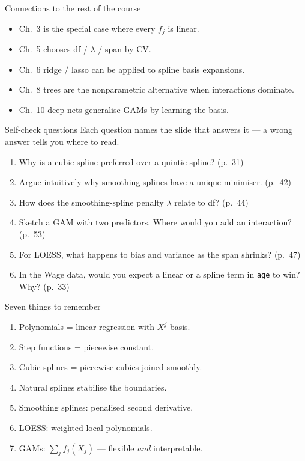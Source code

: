 \documentclass[aspectratio=169,11pt]{beamer}
\begin{document}
\begin{frame}{Connections to the rest of the course}
  \begin{itemize}
    \item Ch.~3 is the special case where every $f_j$ is linear.
    \item Ch.~5 chooses df / $\lambda$ / span by CV.
    \item Ch.~6 ridge / lasso can be applied to spline basis
          expansions.
    \item Ch.~8 trees are the nonparametric alternative when
          interactions dominate.
    \item Ch.~10 deep nets generalise GAMs by learning the basis.
  \end{itemize}
\end{frame}

\begin{frame}{Self-check questions}
  Each question names the slide that answers it --- a wrong answer tells you
  where to read.
  \begin{enumerate}
    \item Why is a cubic spline preferred over a quintic spline?
          (p.~31)
    \item Argue intuitively why smoothing splines have a unique
          minimiser. (p.~42)
    \item How does the smoothing-spline penalty $\lambda$ relate to df?
          (p.~44)
    \item Sketch a GAM with two predictors. Where would you add an
          interaction? (p.~53)
    \item For LOESS, what happens to bias and variance as the span
          shrinks? (p.~47)
    \item In the Wage data, would you expect a linear or a spline term
          in \texttt{age} to win? Why? (p.~33)
  \end{enumerate}
\end{frame}

\begin{frame}{Seven things to remember}
  \begin{enumerate}
    \item Polynomials = linear regression with $X^j$ basis.
    \item Step functions = piecewise constant.
    \item Cubic splines = piecewise cubics joined smoothly.
    \item Natural splines stabilise the boundaries.
    \item Smoothing splines: penalised second derivative.
    \item LOESS: weighted local polynomials.
    \item GAMs: $\sum_j f_j(X_j)$ --- flexible \emph{and} interpretable.
  \end{enumerate}
\end{frame}
\end{document}
